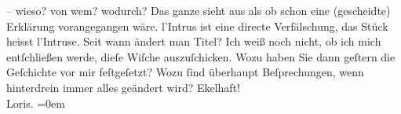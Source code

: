 \begin{ledgroupsized}[t]{13cm}
                    – wieso? von wem? wodurch?\pend
           \pstart
           Das ganze sieht aus als ob schon eine (gescheidte)
                    Erklärung vorangegangen wäre. l’Intrus ist
                    eine directe Verfälschung, das Stück heisst l’Intruse. {\pb}Seit
                    wann ändert man Titel?\pend
           \pstart
           Ich weiß noch nicht, ob ich mich entſchließen werde, dieſe Wiſche auszuſchicken.
                    Wozu haben Sie dann geſtern die Geſchichte vor mir feſtgeſetzt? Wozu ſind
                    überhaupt Beſprechungen, wenn hinterdrein immer alles geändert wird?\pend
           \pstart
           Ekelhaft!{\\[\baselineskip]}\spacefill\mbox{Loris.}\pend
           \leftskip=0em{}
         
         \endnumbering{}\end{ledgroupsized}  \newcommand{\dateiname}{L00092}\newcommand{\titel}{Hugo von Hofmannsthal an Arthur Schnitzler, [4. 4. 1892?]}\newcommand{\editorInnen}{Martin Anton Müller und Gerd-Hermann Susen}
      